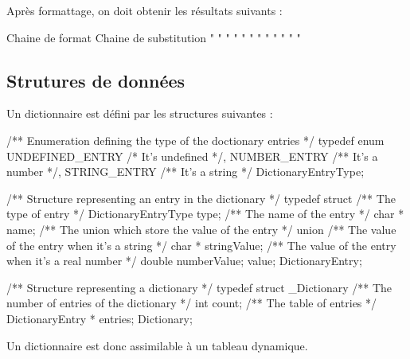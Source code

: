Après formattage, on doit obtenir les résultats suivants :
\begin{csource}
Chaine de format	                        Chaine de substitution
"%
"%
"%
"%
"%
"%
"%
"%
"%
"%
"%
"%
\end{csource}

\subsection{Strutures de données}

Un dictionnaire est défini par les structures suivantes :
\begin{csource}

/** Enumeration defining the type of the doctionary entries */
typedef enum {
    UNDEFINED_ENTRY /* It's undefined */,
    NUMBER_ENTRY /** It's a number */,
    STRING_ENTRY /** It's a string */
} DictionaryEntryType;

/** Structure representing an entry in the dictionary */
typedef struct {
    /** The type of entry */
    DictionaryEntryType type;
    /** The name of the entry */
    char * name;
    /** The union which store the value of the entry */
    union {
        /** The value of the entry when it's a string */
        char * stringValue;
        /** The value of the entry when it's a real number */
        double numberValue;
    } value;
} DictionaryEntry;

/** Structure representing a dictionary */
typedef struct _Dictionary {
    /** The number of entries of the dictionary */
    int count;
    /** The table of entries */
    DictionaryEntry * entries;
} Dictionary;
\end{csource}
Un dictionnaire est donc assimilable à un tableau dynamique.

